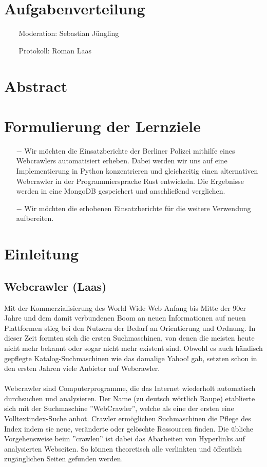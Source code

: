 \documentclass[chapterprefix=false, 12pt, a4paper, oneside, parskip=half, listof=totoc, bibliography=totoc, numbers=noendperiod]{scrbook}
\begin{document}
    \tableofcontents

    \chapter{Aufgabenverteilung}
\begin{itemize}
	\item[$$] Moderation: Sebastian Jüngling
	\item[$$] Protokoll: Roman Laas
\end{itemize}

    \chapter{Abstract}

    \chapter{Formulierung der Lernziele}

\begin{itemize}
\item[$-$] Wir möchten die Einsatzberichte der Berliner Polizei mithilfe eines Webcrawlers automatisiert erheben. Dabei werden wir uns auf eine Implementierung in Python konzentrieren und gleichzeitig einen alternativen Webcrawler in der Programmiersprache Rust entwickeln. Die Ergebnisse werden in eine MongoDB gespeichert und anschließend verglichen.
\item[$-$] Wir möchten die erhobenen Einsatzberichte für die weitere Verwendung aufbereiten.
\end{itemize}

	\chapter{Einleitung}

\section{Webcrawler (Laas)}
Mit der Kommerzialisierung des World Wide Web Anfang bis Mitte der 90er Jahre und dem damit verbundenen Boom an neuen Informationen auf neuen Plattformen stieg bei den Nutzern der Bedarf an Orientierung und Ordnung. In dieser Zeit formten sich die ersten Suchmaschinen, von denen die meisten heute nicht mehr bekannt oder sogar nicht mehr existent sind. Obwohl es auch händisch gepflegte Katalog-Suchmaschinen wie das damalige Yahoo! gab, setzten schon in den ersten Jahren viele Anbieter auf Webcrawler.\\\\
Webcrawler sind Computerprogramme, die das Internet wiederholt automatisch durchsuchen und analysieren. Der Name (zu deutsch wörtlich Raupe) etablierte sich mit der Suchmaschine ''WebCrawler'', welche als eine der ersten eine Volltextindex-Suche anbot. Crawler ermöglichen Suchmaschinen die Pflege des Index indem sie neue, veränderte oder gelöschte Ressourcen finden. Die übliche Vorgehensweise beim ''crawlen'' ist dabei das Abarbeiten von Hyperlinks auf analysierten Webseiten. So können theoretisch alle verlinkten und öffentlich zugänglichen Seiten gefunden werden.
\end{document}
